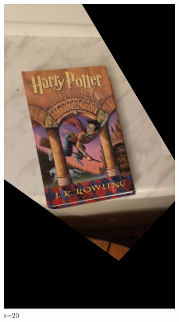 \documentclass{article}
\begin{document}
\begin{figure}[H]
\begin{subfigure}[b]{0.3\linewidth}
			\includegraphics[width=\linewidth]{p20t.png}
			\caption{t=20}
		\end{subfigure}
		\begin{subfigure}[b]{0.3\linewidth}

\end{subfigure}
\end{figure}
\end{document}
